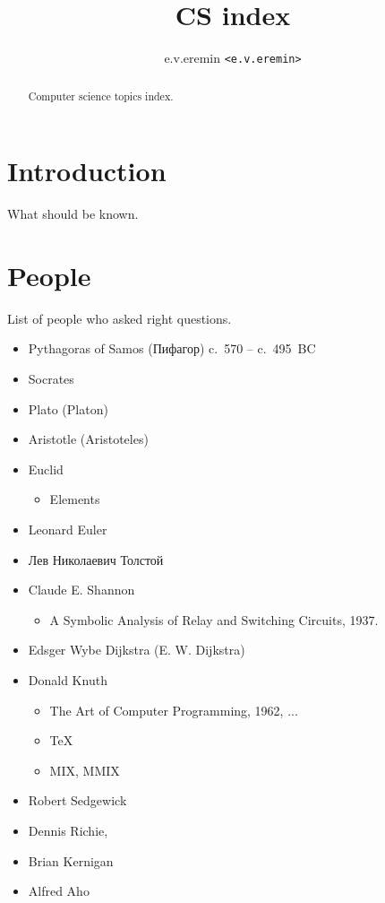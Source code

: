 \documentclass[12pt,a4paper]{article}
\begin{document}
\title{CS index}
\author{e.v.eremin \texttt{<e.v.eremin>}}

\maketitle

\begin{abstract}
Computer science topics index.
\end{abstract}

\section{Introduction}

What should be known.

\section{People}

List of people who asked right questions.

\begin{itemize}
\item Pythagoras of Samos (Пифагор) c.~570 – c.~495~BC
\item Socrates
\item Plato (Platon)
\item Aristotle (Aristoteles)
\item Euclid
	\begin{itemize}
	\item Elements
	\end{itemize}
\item Leonard Euler
\item Лев Николаевич Толстой
\item Claude E. Shannon
	\begin{itemize}
	\item A Symbolic Analysis of Relay and Switching Circuits, 1937.
	\end{itemize}
\item Edsger Wybe Dijkstra (E. W. Dijkstra)
\item Donald Knuth
	\begin{itemize}
	\item The Art of Computer Programming, 1962, ...
	\item \TeX
	\item MIX, MMIX
	\end{itemize}
\item Robert Sedgewick
\item Dennis Richie,
\item Brian Kernigan
\item Alfred Aho
\end{itemize}
\end{document}
